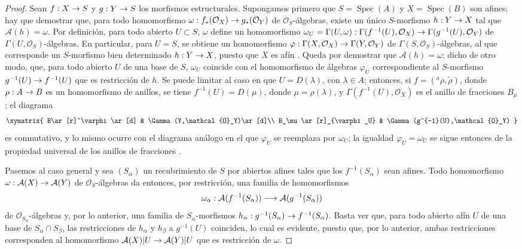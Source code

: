 \documentclass[oneside,10pt]{amsart}
\makeatletter
\newcommand{\ega@arrow}[2]{\mathchoice{#1}{#2}{#2}{#2}}
\renewcommand{\to}{\ega@arrow{\longrightarrow}{\rightarrow}}
\newcommand{\oldpage}[2][]{\marginnote{\normalfont\footnotesize\textbf{#1}~|~#2}\ignorespaces}
\makeatother
\begin{document}
\begin{proof}
Sean $f:X\to S$ y $g:Y\to S$ los morfismos estructurales.
Supongamos primero que $S=\operatorname{Spec}(A)$ y $X=\operatorname{Spec}(B)$ son afines; hay que demostrar que, para todo homomorfismo $\omega:f_*(\mathcal{O}_X)\to g_*(\mathcal{O}_Y)$ de $\mathcal{O}_S$-álgebras, existe un único $S$-morfismo $h:Y\to X$ tal que $\mathcal{A}(h)=\omega$.
Por definición, para todo abierto $U\subset
S$, $\omega$ define un homomorfismo
$\omega_U=\Gamma(U,\omega):\Gamma(f^{-1}(U),\mathcal{O}_X)\to\Gamma(g^{-1}(U),\mathcal{O}_Y)$
de $\Gamma(U,\mathcal{O}_S)$-álgebras.
En particular, para $U=S$, se obtiene un homomorfismo $\varphi:\Gamma(X,\mathcal{O}_X)\to\Gamma(Y,\mathcal{O}_Y)$ de $\Gamma(S,\mathcal{O}_S)$-álgebras, al que corresponde un $S$-morfismo bien determinado $h:Y\to X$, puesto que $X$ es afín .
Queda por demostrar que $\mathcal{A}(h)=\omega$; dicho de otro modo, que, para todo abierto $U$ de una base de $S$, $\omega_U$ coincide con el homomorfismo de álgebras $\varphi_U$ correspondiente al $S$-morfismo $g^{-1}(U)\to f^{-1}(U)$ que es restricción de $h$.
Se puede limitar al caso en que $U=D(\lambda)$, con $\lambda\in A$; entonces, si $f=({}^a\rho,\widetilde{\rho})$, donde $\rho:A\to B$ es un homomorfismo de anillos, se tiene $f^{-1}(U)=D(\mu)$, donde $\mu=\rho(\lambda)$, y $\Gamma(f^{-1}(U),\mathcal{O}_X)$ es el anillo de fracciones $B_\mu$; el diagrama
\[
  \xymatrix{
    B\ar[r]^\varphi\ar[d] & \Gamma(Y,\mathcal{O}_Y)\ar[d]\\
    B_\mu\ar[r]_{\varphi_U} & \Gamma(g^{-1}(U),\mathcal{O}_Y)
  }
\]
es conmutativo, y lo mismo ocurre con el diagrama análogo en el que $\varphi_U$ se reemplaza por $\omega_U$; la igualdad $\varphi_U=\omega_U$ se sigue entonces de la propiedad universal de los anillos de fracciones .

Pasemos al caso general y sea $(S_\alpha)$ un recubrimiento de $S$ por abiertos afines
\oldpage[II]{8}
tales que los $f^{-1}(S_\alpha)$ sean afines.
Todo homomorfismo $\omega:\mathcal{A}(X)\to\mathcal{A}(Y)$ de $\mathcal{O}_S$-álgebras da entonces, por restricción, una familia de homomorfismos
\[
  \omega_\alpha:
  \mathcal{A}(f^{-1}(S_\alpha))\to
  \mathcal{A}(g^{-1}(S_\alpha))
\]
de $\mathcal{O}_{S_\alpha}$-álgebras y, por lo anterior, una familia de $S_\alpha$-morfismos $h_\alpha:g^{-1}(S_\alpha)\to f^{-1}(S_\alpha)$.
Basta ver que, para todo abierto afín $U$ de una base de $S_\alpha\cap S_\beta$, las restricciones de $h_\alpha$ y $h_\beta$ a $g^{-1}(U)$ coinciden, lo cual es evidente, puesto que, por lo anterior, ambas restricciones corresponden al homomorfismo $\mathcal{A}(X)|U\to\mathcal{A}(Y)|U$ que es restricción de $\omega$.
\end{proof}
\end{document}
